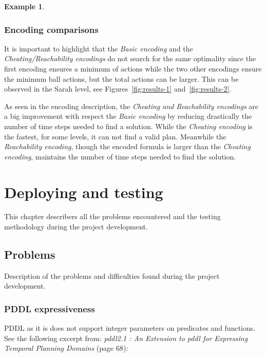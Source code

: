 \documentclass{report}
\theoremstyle{plain}
\newtheorem{example}{Example}[section]
\begin{document}
\begin{example}
\begin{minipage}{0.5\textwidth}
\end{minipage}
\end{example}

\subsection{Encoding comparisons}
It is important to highlight that the \emph{Basic encoding} and the \emph{Cheating/Reachability encodings} do not search for the same optimality since the first encoding ensures a minimum of actions while the two other encodings ensure the minimum ball actions, but the total actions can be larger. This can be observed in the Sarah level, see Figures~\ref{fig:results-1} and~\ref{fig:results-2}.

As seen in the encoding description, the \emph{Cheating and Reachability encodings} are a big improvement with respect the \emph{Basic encoding} by reducing drastically the number of time steps needed to find a solution. While the \emph{Cheating encoding} is the fastest, for some levels, it can not find a valid plan. Meanwhile the \emph{Reachability encoding}, though the encoded formula is larger than the \emph{Cheating encoding}, maintains the number of time steps needed to find the solution.

\chapter{Deploying and testing}
This chapter describers all the problems encountered  and the testing methodology during the project development.

\section{Problems}
Description of the problems and difficulties found during the project development.

\subsection{PDDL expressiveness}
PDDL as it is does not support integer parameters on predicates and functions. See the following excerpt from: \emph{pddl2.1 : An Extension to pddl for Expressing Temporal
Planning Domains} (page 68):
\end{document}
